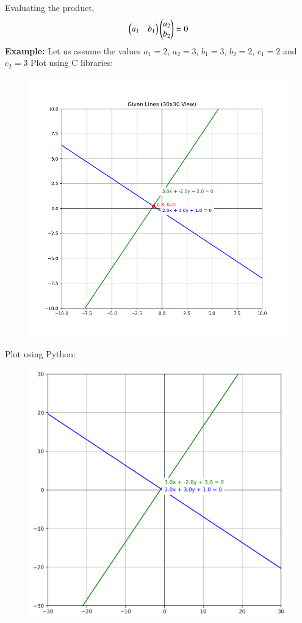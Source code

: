 \documentclass[journal,12pt,onecolumn]{IEEEtran}
\begin{document}
Evaluating the product,
\begin{align}
    \begin{pmatrix}a_1 & b_1\end{pmatrix}\begin{pmatrix}a_2 \\ b_2\end{pmatrix}=0 
\end{align}
\textbf{Example:}
Let us assume the values $a_1=2$, $a_2=3$, $b_1=3$, $b_2=2$, $c_1=2$ and $c_2=3$
Plot using C libraries:
\begin{figure}[H]
	\centering
	\includegraphics[scale=0.5]{img}
	\caption*{}
	\label{img1}
\end{figure}
Plot using Python:
\begin{figure}[H]
	\centering
	\includegraphics[scale=0.5]{img1}
	\caption*{}
	\label{img2}
\end{figure}
\end{document}

